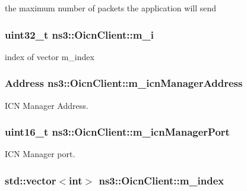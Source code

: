 the maximum number of packets the application will send 

\hypertarget{classns3_1_1OicnClient_a327312bc75b569a1982003fd61e3e45e}{
\subsubsection[{m\-\_\-i}]{\setlength{\rightskip}{0pt plus 5cm}uint32\-\_\-t ns3\-::\-Oicn\-Client\-::m\-\_\-i\hspace{0.3cm}{\ttfamily [private]}}}\label{classns3_1_1OicnClient_a327312bc75b569a1982003fd61e3e45e}


index of vector m\-\_\-index 

\hypertarget{classns3_1_1OicnClient_a52010a30a1032d875127a331b734f107}{
\subsubsection[{m\-\_\-icn\-Manager\-Address}]{\setlength{\rightskip}{0pt plus 5cm}Address ns3\-::\-Oicn\-Client\-::m\-\_\-icn\-Manager\-Address\hspace{0.3cm}{\ttfamily [private]}}}\label{classns3_1_1OicnClient_a52010a30a1032d875127a331b734f107}


I\-C\-N Manager Address. 

\hypertarget{classns3_1_1OicnClient_abb0ac949b2aeea8fb892065a0372d0cc}{
\subsubsection[{m\-\_\-icn\-Manager\-Port}]{\setlength{\rightskip}{0pt plus 5cm}uint16\-\_\-t ns3\-::\-Oicn\-Client\-::m\-\_\-icn\-Manager\-Port\hspace{0.3cm}{\ttfamily [private]}}}\label{classns3_1_1OicnClient_abb0ac949b2aeea8fb892065a0372d0cc}


I\-C\-N Manager port. 

\hypertarget{classns3_1_1OicnClient_aee7af038133594a358a77ea3ccece6d3}{
\subsubsection[{m\-\_\-index}]{\setlength{\rightskip}{0pt plus 5cm}std\-::vector$<$int$>$ ns3\-::\-Oicn\-Client\-::m\-\_\-index\hspace{0.3cm}{\ttfamily [private]}}}\label{classns3_1_1OicnClient_aee7af038133594a358a77ea3ccece6d3}


